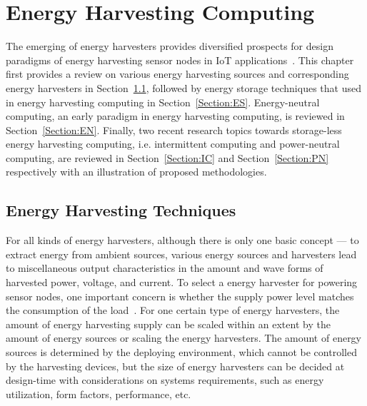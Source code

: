 \chapter{Energy Harvesting Computing} \label{Chapter:Review}

The emerging of energy harvesters provides diversified prospects for design paradigms of energy harvesting sensor nodes in IoT applications~\cite{miorandi2012internet}. This chapter first provides a review on various energy harvesting sources and corresponding energy harvesters in Section~\ref{Section:EH}, followed by energy storage techniques that used in energy harvesting computing in Section~\ref{Section:ES}. Energy-neutral computing, an early paradigm in energy harvesting computing, is reviewed in Section~\ref{Section:EN}. Finally, two recent research topics towards storage-less energy harvesting computing, i.e. intermittent computing and power-neutral computing, are reviewed in Section~\ref{Section:IC} and Section~\ref{Section:PN} respectively with an illustration of proposed methodologies.

\section{Energy Harvesting Techniques} \label{Section:EH}

For all kinds of energy harvesters, although there is only one basic concept --- to extract energy from ambient sources, various energy sources and harvesters lead to miscellaneous output characteristics in the amount and wave forms of harvested power, voltage, and current. To select a energy harvester for powering sensor nodes, one important concern is whether the supply power level matches the consumption of the load~\cite{shaikh2016energy}. For one certain type of energy harvesters, the amount of energy harvesting supply can be scaled within an extent by the amount of energy sources or scaling the energy harvesters. The amount of energy sources is determined by the deploying environment, which cannot be controlled by the harvesting devices, but the size of energy harvesters can be decided at design-time with considerations on systems requirements, such as energy utilization, form factors, performance, etc. 


